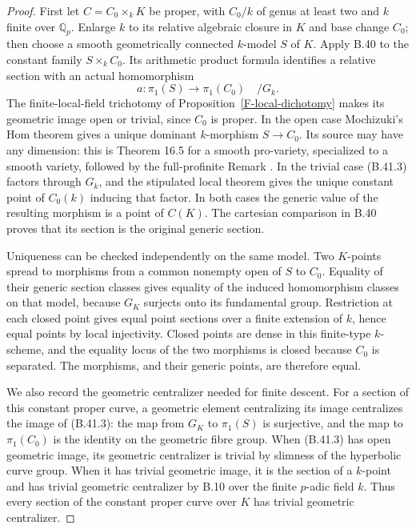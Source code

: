 \documentclass[11pt,oneside]{article}
\begin{document}
\begin{proof}
First let $C=C_0\times_k K$ be proper, with
$C_0/k$ of genus at least two and $k$ finite over
$\mathbb Q_p$. Enlarge $k$ to its relative
algebraic closure in $K$ and base change $C_0$;
then choose a smooth geometrically connected
$k$-model $S$ of $K$. Apply B.40 to the constant
family $S\times_k C_0$. Its arithmetic product
formula identifies a relative section with an
actual homomorphism
\[
 a:\pi_1(S)\longrightarrow\pi_1(C_0)
                                          \quad/G_k.
 \tag{B.41.3}
\]
The finite-local-field trichotomy of
Proposition~\ref{F-local-dichotomy} makes its
geometric image open or trivial, since $C_0$ is
proper. In the open case Mochizuki's Hom theorem
gives a unique dominant $k$-morphism
$S\to C_0$. Its source may have any dimension:
this is Theorem 16.5 for a smooth pro-variety,
specialized to a smooth variety, followed by the
full-profinite Remark \cite{F-Mochizuki}.
In the trivial case (B.41.3) factors through
$G_k$, and the stipulated local theorem gives
the unique constant point of $C_0(k)$ inducing
that factor. In both cases the generic value of
the resulting morphism is a point of $C(K)$.
The cartesian comparison in B.40 proves that
its section is the original generic section.

Uniqueness can be checked independently on the
same model. Two $K$-points spread to morphisms
from a common nonempty open of $S$ to $C_0$.
Equality of their generic section classes gives
equality of the induced homomorphism classes on
that model, because $G_K$ surjects onto its
fundamental group. Restriction at each closed
point gives equal point sections over a finite
extension of $k$, hence equal points by local
injectivity. Closed points are dense in this
finite-type $k$-scheme, and the equality locus
of the two morphisms is closed because $C_0$ is
separated. The morphisms, and their generic
points, are therefore equal.

We also record the geometric centralizer needed
for finite descent. For a section of this constant
proper curve, a geometric element centralizing
its image centralizes the image of (B.41.3):
the map from $G_K$ to $\pi_1(S)$ is surjective,
and the map to $\pi_1(C_0)$ is the identity on
the geometric fibre group. When (B.41.3) has
open geometric image, its geometric centralizer
is trivial by slimness of the hyperbolic curve
group. When it has trivial geometric image,
it is the section of a $k$-point and has trivial
geometric centralizer by B.10 over the finite
$p$-adic field $k$. Thus every section of the
constant proper curve over $K$ has trivial
geometric centralizer.


\end{proof}
\end{document}
